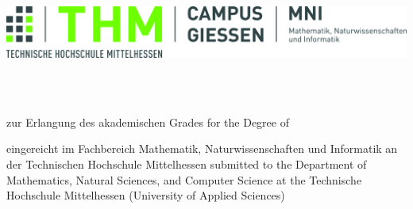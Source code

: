 \begin{titlepage}

	\begin{center}
		\includegraphics[width=1\textwidth]{assets/images/Logo_THM_MNI.jpg}
		\par\end{center}

	\noindent \begin{center}
		\vspace{1cm}

		\par\end{center}

	\noindent \begin{center}
		\textsf{\textbf{\huge \theThesis}}\textsf{}\\
		\textsf{}\\
		\textsf{\Large \theTitle}
		\par\end{center}{\Large \par}

	\vspace{1cm}

	\begin{center}
		{zur Erlangung des akademischen Grades}
		{for the Degree of}

		\par\end{center}

	\begin{center}
		{\textsf{\large \theAcedemicTitle}}
		\par\end{center}{\large \par}

	\begin{center}
		{eingereicht im Fachbereich Mathematik, Naturwissenschaften und Informatik an der Technischen Hochschule Mittelhessen}
		{submitted to the Department of Mathematics, Natural Sciences, and Computer Science at the Technische Hochschule Mittelhessen (University of Applied Sciences)}

		{\large \vspace{1cm}
		}
		\par\end{center}{\large \par}


\end{titlepage}
